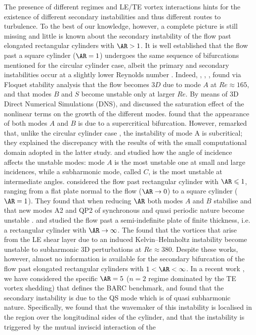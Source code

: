\documentclass{jfm}
\begin{document}
The presence of different regimes and LE/TE vortex interactions hints for the existence of different secondary instabilities and thus different routes to turbulence. To the best of our knowledge, however, a complete picture is still missing and little is known about the secondary instability of the flow past elongated rectangular cylinders with $\AR>1$. It is well established that the flow past a square cylinder ($\AR=1$) undergoes the same sequence of bifurcations mentioned for the circular cylinder case, albeit the primary and secondary instabilities occur at a slightly lower Reynolds number \citep[see for example][]{jiang-cheng-2018,blackburn-sheard-2010}. Indeed, \cite{robichaux-balachandar-vanka-1999}, \cite{blackburn-lopez-2003}, \cite{sheard-fitzgerald-ryan-2009}, \cite{blackburn-sheard-2010} found via Floquet stability analysis that the flow becomes $3D$ due to mode $A$ at $Re \approx 165$, and that modes $B$ and $S$ become unstable only at larger $Re$. By means of 3D Direct Numerical Simulations (DNS), \cite{sheard-fitzgerald-ryan-2009} and \cite{jiang-cheng-an-2018} discussed the saturation effect of the nonlinear terms on the growth of the different modes. \cite{sheard-fitzgerald-ryan-2009} found that the appearance of both modes $A$ and $B$ is due to a supercritical bifurcation. However, \cite{jiang-cheng-an-2018} remarked that, unlike the circular cylinder case \citep{henderson-1997}, the instability of mode A is subcritical; they explained the discrepancy with the results of \cite{sheard-fitzgerald-ryan-2009} with the small computational domain adopted in the latter study. \cite{sheard-fitzgerald-ryan-2009} and \cite{sheard-2011} studied how the angle of incidence affects the unstable modes: mode $A$ is the most unstable one at small and large incidences, while a subharmonic mode, called $C$, is the most unstable at intermediate angles. \cite{choi-yang-2014} considered the flow past rectangular cylinder with $\AR \le 1$, ranging from a flat plate normal to the flow ($\AR \rightarrow 0$) to a square cylinder ($\AR=1$). They found that when reducing $\AR$ both modes $A$ and $B$ stabilise and that new modes A2 and QP2 of synchronous and quasi periodic nature become unstable \citep[see also][]{thompson-etal-2006}. \cite{chaurasia-thompson-2011} and \cite{huang-etal-2017} studied the flow past a semi-indefinite plate of finite thickness, i.e. a rectangular cylinder with $\AR \rightarrow \infty$. The found that the vortices that arise from the LE shear layer due to an induced Kelvin--Helmholtz instability become unstable to subharmonic 3D perturbations at $Re \approx 380$. Despite these works, however, almost no information is available for the secondary bifurcation of the flow past elongated rectangular cylinders with $1 < \AR < \infty$. In a recent work \citep{chiarini-quadrio-auteri-2022d}, we have considered the specific $\AR=5$ ($n=2$ regime dominated by the TE vortex shedding) that defines the BARC benchmark, and found that the secondary instability is due to the QS mode which is of quasi subharmonic nature. Specifically, we found that the wavemaker \citep{monkewitz-huerre-chomaz-1993} of this instability is localised in the region over the longitudinal sides of the cylinder, and that the instability is triggered by the mutual inviscid interaction of the 
\end{document}
